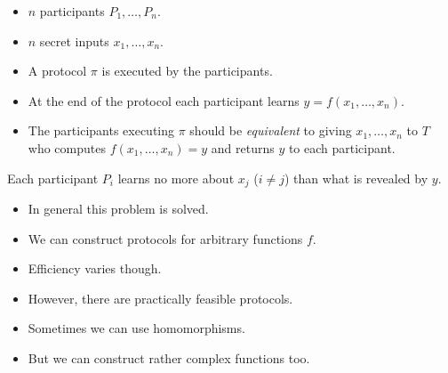 \begin{frame}
  \begin{definition}
    \begin{itemize}
      \item \(n\) participants \(P_1, \ldots, P_n\).
      \item \(n\) secret inputs \(x_1, \ldots, x_n\).

        \pause{}

      \item A protocol \(\pi\) is executed by the participants.
      \item At the end of the protocol each participant learns \(y = f(x_1, 
          \ldots, x_n)\).

        \pause{}

      \item The participants executing \(\pi\) should be \emph{equivalent} to 
        giving \(x_1, \ldots, x_n\) to  \(T\) who computes \(f(x_1, 
          \ldots, x_n) = y\) and returns \(y\) to each participant.
    \end{itemize}
  \end{definition}

  \pause{}

  \begin{remark}
    Each participant \(P_i\) learns no more about \(x_j\) (\(i\neq j\))
    than what is revealed by \(y\).
  \end{remark}
\end{frame}

\begin{frame}
  \begin{itemize}
    \item In general this problem is solved.
    \item We can construct protocols for arbitrary functions \(f\).

      \pause{}

    \item Efficiency varies though.
    \item However, there are practically feasible protocols.

      \pause{}

    \item Sometimes we can use homomorphisms.
    \item But we can construct rather complex functions too.
  \end{itemize}
\end{frame}

